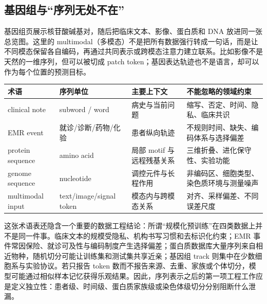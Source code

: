 
\subsection{基因组与“序列无处不在”}

基因组页展示核苷酸碱基对，随后把临床文本、影像、蛋白质和 DNA 放进同一张总览图。这里的 multimodal（多模态）不是把所有数据强行转成一句话，而是让不同模态保留各自编码，再通过共同表示或跨模态注意力建立联系。比如影像不是天然的一维序列，但可以被切成 patch token；基因表达轨迹也不是语言，却可以作为每个位置的预测目标。



\begin{longtable}{@{}L{0.16\textwidth}L{0.19\textwidth}L{0.22\textwidth}L{0.31\textwidth}@{}}
\toprule
术语 & 序列单位 & 主要上下文 & 不能忽略的领域约束 \\
\midrule
clinical note & subword / word & 病史与当前问题 & 缩写、否定、时间、隐私、临床共识 \\
EMR event & 就诊/诊断/药物/化验 & 患者纵向轨迹 & 不规则时间、缺失、编码体系与选择偏差 \\
protein sequence & amino acid & 局部 motif 与远程残基关系 & 三维折叠、进化保守性、实验功能 \\
genome sequence & nucleotide & 调控元件与长程作用 & 非编码区、细胞类型、染色质环境与测量噪声 \\
multimodal input & text/image/signal token & 模态内与跨模态关系 & 对齐、采样偏差、不同误差尺度 \\
\bottomrule
\end{longtable}

这张术语表还隐含一个重要的数据工程结论：所谓“规模化预训练”在四类数据上并不是同一件事。临床文本的规模受隐私、机构书写习惯和去标识化约束；EMR 事件常因保险、就诊可及性与编码制度产生选择偏差；蛋白质数据库大量序列来自相近物种，随机切分可能让训练集和测试集共享近亲；基因组 track 则集中在少数细胞系与实验协议。若只报告 token 数而不报告来源、去重、家族或个体切分，模型可能通过相似样本记忆获得乐观结果。因此，序列表示之后的第一项工程工作应是定义独立性：患者级、时间级、蛋白质家族级或染色体级切分分别阻断什么泄漏。

